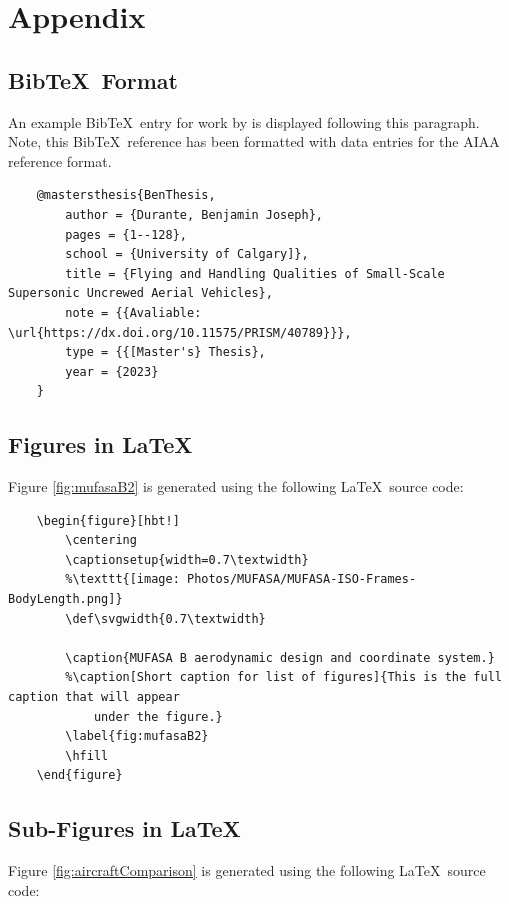 \section{Appendix}

\subsection{Bib\TeX\ Format} \label{sec:appendixBibTex}
An example Bib\TeX\ entry for work by \citeauthor{BenThesis} \cite{BenThesis} is displayed following this paragraph. 
Note, this Bib\TeX\ reference has been formatted with data entries for the AIAA reference format.  

\begin{verbatim}
	@mastersthesis{BenThesis,
		author = {Durante, Benjamin Joseph},
		pages = {1--128},
		school = {University of Calgary]},
		title = {Flying and Handling Qualities of Small-Scale Supersonic Uncrewed Aerial Vehicles},
		note = {{Avaliable: \url{https://dx.doi.org/10.11575/PRISM/40789}}},
		type = {{[Master's} Thesis},
		year = {2023}
	}
\end{verbatim}

\subsection{Figures in \LaTeX} \label{sec:appendixFigureSourceCode}

Figure \ref{fig:mufasaB2} is generated using the following \LaTeX\ source code:

\begin{verbatim}
	\begin{figure}[hbt!]
		\centering
		\captionsetup{width=0.7\textwidth}
		%\texttt{[image: Photos/MUFASA/MUFASA-ISO-Frames-BodyLength.png]}
		\def\svgwidth{0.7\textwidth}
		
		\caption{MUFASA B aerodynamic design and coordinate system.}
		%\caption[Short caption for list of figures]{This is the full caption that will appear 
			under the figure.}
		\label{fig:mufasaB2}
		\hfill
	\end{figure}
\end{verbatim}

\subsection{Sub-Figures in \LaTeX} \label{sec:appendixSubFigureSourceCode}

Figure \ref{fig:aircraftComparison} is generated using the following \LaTeX\ source code:

